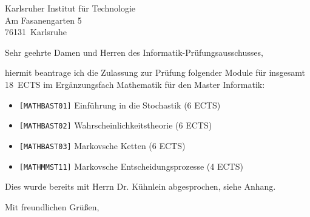 \documentclass[a4paper, 12pt, KOMAold]{scrlttr2}
\newcommand{\Empfaenger}{Karlsruher Institut für Technologie} %
\newcommand{\EStrasse}{Am Fasanengarten 5}  %
\newcommand{\EPLZ}{76131}                   %
\newcommand{\EOrt}{Karlsruhe}               %
\newcommand{\DocTitle}{Antrag auf Prüfungszulassung} %
\begin{document}
    \begin{letter}{\Empfaenger \\ \EStrasse \\ \EPLZ~\EOrt}
    \date{\today}%
    \subject{\DocTitle}
    \opening{Sehr geehrte Damen und Herren des Informatik-Prüfungsausschusses,}

    hiermit beantrage ich die Zulassung zur Prüfung folgender Module für
    insgesamt 18~ECTS im Ergänzungsfach Mathematik für den Master Informatik:

    \begin{itemize}
        \item \texttt{[MATHBAST01]} Einführung in die Stochastik (6 ECTS)
        \item \texttt{[MATHBAST02]} Wahrscheinlichkeitstheorie (6 ECTS)
        \item \texttt{[MATHBAST03]} Markovsche Ketten (6 ECTS)
        \item \texttt{[MATHMMST11]} Markovsche Entscheidungsprozesse (4 ECTS)
    \end{itemize}

     Dies wurde bereits mit Herrn Dr. Kühnlein abgesprochen, siehe Anhang.

    \closing{Mit freundlichen Grüßen,}
    \end{letter}
\end{document}
